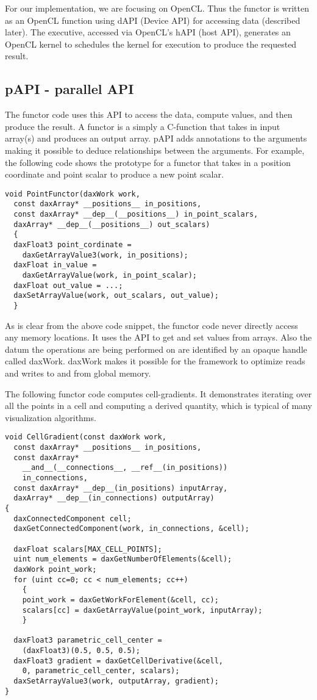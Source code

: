 \documentclass{vgtc}                          %
\begin{document}
For our implementation, we are focusing on OpenCL. Thus the functor is
written as an OpenCL function using dAPI (Device API) for accessing data
(described later). The executive, accessed via OpenCL's hAPI (host API),
generates an OpenCL kernel to schedules the kernel for execution to produce
the requested result.

\subsection{pAPI - parallel API}

The functor code uses this API to access the data, compute values, and then
produce the result. A functor is a simply a C-function that takes in input
array(s) and produces an output array. pAPI adds annotations to the arguments
making it possible to deduce relationships between the arguments. For example, the
following code shows the prototype for a functor that takes in a position
coordinate and point scalar to produce a new point scalar.

{\small
\begin{verbatim}
void PointFunctor(daxWork work,
  const daxArray* __positions__ in_positions,
  const daxArray* __dep__(__positions__) in_point_scalars,
  daxArray* __dep__(__positions__) out_scalars)
  {
  daxFloat3 point_cordinate =
    daxGetArrayValue3(work, in_positions);
  daxFloat in_value =
    daxGetArrayValue(work, in_point_scalar);
  daxFloat out_value = ...;
  daxSetArrayValue(work, out_scalars, out_value);
  }
\end{verbatim}
}

As is clear from the above code snippet, the functor code never directly access
any memory locations. It uses the API to get and set values from arrays. Also
the datum the operations are being performed on are identified by an opaque
handle called daxWork. daxWork makes it possible for the framework to optimize
reads and writes to and from global memory.

The following functor code computes cell-gradients. It demonstrates
iterating over all the points in a cell and computing a derived quantity, which
is typical of many visualization algorithms.

{\small
\begin{verbatim}
void CellGradient(const daxWork work,
  const daxArray* __positions__ in_positions,
  const daxArray*
    __and__(__connections__, __ref__(in_positions))
    in_connections,
  const daxArray* __dep__(in_positions) inputArray,
  daxArray* __dep__(in_connections) outputArray)
{
  daxConnectedComponent cell;
  daxGetConnectedComponent(work, in_connections, &cell);

  daxFloat scalars[MAX_CELL_POINTS];
  uint num_elements = daxGetNumberOfElements(&cell);
  daxWork point_work;
  for (uint cc=0; cc < num_elements; cc++)
    {
    point_work = daxGetWorkForElement(&cell, cc);
    scalars[cc] = daxGetArrayValue(point_work, inputArray);
    }

  daxFloat3 parametric_cell_center =
    (daxFloat3)(0.5, 0.5, 0.5);
  daxFloat3 gradient = daxGetCellDerivative(&cell,
    0, parametric_cell_center, scalars);
  daxSetArrayValue3(work, outputArray, gradient);
}
\end{verbatim}
}
\end{document}
